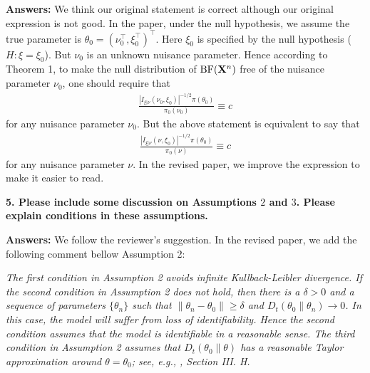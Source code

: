\documentclass[11pt]{article}
\theoremstyle{plain}
\theoremstyle{definition}
\theoremstyle{remark}
\begin{document}
\textbf{Answers:}
We think our original statement is correct although our original expression is not good.
In the paper, under the null hypothesis, we assume the true parameter is $\theta_0 = (\nu_0^\top, \xi_0^\top)^\top$.
Here $\xi_0$ is specified by the null hypothesis ($H: \xi = \xi_0$).
But $\nu_0$ is an unknown nuisance parameter.
Hence according to Theorem 1, to make the null distribution of $\text{BF}(\mathbf{X}^n)$ free of the nuisance parameter $\nu_0$, one should require that
\begin{align*}
     \frac{\left| I_{\xi | \nu} (\nu_0, \xi_0) \right|^{-1/2} \pi(\theta_0) }{\pi_0(\nu_0)} \equiv c
\end{align*}
for any nuisance parameter $\nu_0$.
But the above statement is equivalent to say that
\begin{align*}
     \frac{\left| I_{\xi | \nu} (\nu, \xi_0) \right|^{-1/2} \pi(\theta_0) }{\pi_0(\nu)} \equiv c
\end{align*}
for any nuisance parameter $\nu$.
In the revised paper, we improve the expression to make it easier to read.

\textbf{
5.
Please include some discussion on Assumptions $2$ and $3$.
Please explain conditions in these assumptions.
}

\textbf{Answers:}
We follow the reviewer's suggestion.
In the revised paper, we add the following comment bellow Assumption 2:

\begin{adjustwidth}{1.5em}{1.5em}
    \emph{
            The first condition in Assumption 2 avoids infinite Kullback-Leibler divergence.
            If the second condition in Assumption 2 does not hold, then there is a $\delta>0$ and a sequence of parameters             $\{\theta_n\}$ such that $\|\theta_n - \theta_0\| \geq \delta$ and $D_t(\theta_0 \| \theta_n ) \to 0  $.
            In this case, the model will suffer from loss of identifiability.
            Hence the second condition assumes that the model is identifiable in a reasonable sense.
            The third condition in Assumption 2 assumes that $D_t(\theta_0 \| \theta)$ has a reasonable Taylor approximation around    $\theta =\theta_0$; see, e.g., \cite{Erven2014}, Section III. H.
    }
\end{adjustwidth}
\end{document}
